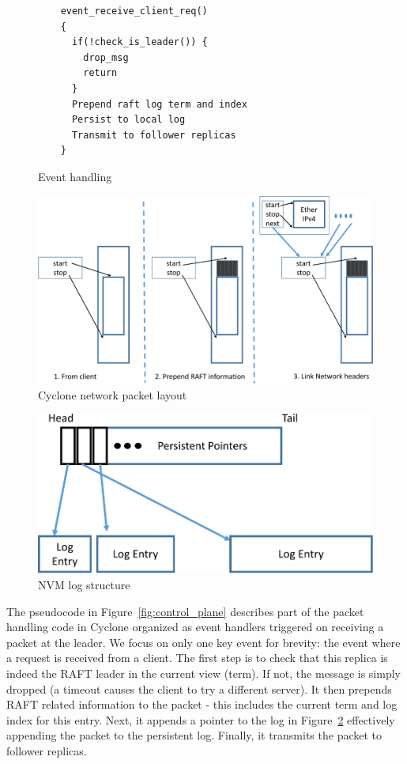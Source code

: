 \documentclass[letterpaper,twocolumn,10pt]{article}
\begin{document}
\begin{figure}
\begin{minipage}{.5\textwidth}
\scriptsize
\begin{verbatim}
    event_receive_client_req()
    {
      if(!check_is_leader()) {
        drop_msg
        return
      }
      Prepend raft log term and index
      Persist to local log
      Transmit to follower replicas
    }
\end{verbatim}
\caption{Event handling}
\label{fig:control_plane}
\end{minipage}
\begin{minipage}{.5\textwidth}
  \centering
  \includegraphics[scale=0.3]{figures2/network_packet.pdf}
  \caption{Cyclone network packet layout}
  \label{fig:packet_layout}
\end{minipage}
\end{figure}

\begin{figure}
\centering
\includegraphics[scale=0.3]{figures2/nvm_log.pdf}
\caption{NVM log structure}
\label{fig:nvm_log}
\end{figure}


The pseudocode in Figure~\ref{fig:control_plane} describes part of the packet
handling code in Cyclone organized as event handlers triggered on receiving a
packet at the leader. We focus on only one key event for brevity: the event
where a request is received from a client. The first step is to check that this
replica is indeed the RAFT leader in the current view (term). If not, the
message is simply dropped (a timeout causes the client to try a different
server). It then prepends RAFT related information to the packet - this includes
the current term and log index for this entry. Next, it appends a pointer to the
log in Figure~\ref{fig:nvm_log} effectively appending the packet to the
persistent log. Finally, it transmits the packet to follower replicas.
\end{document}
